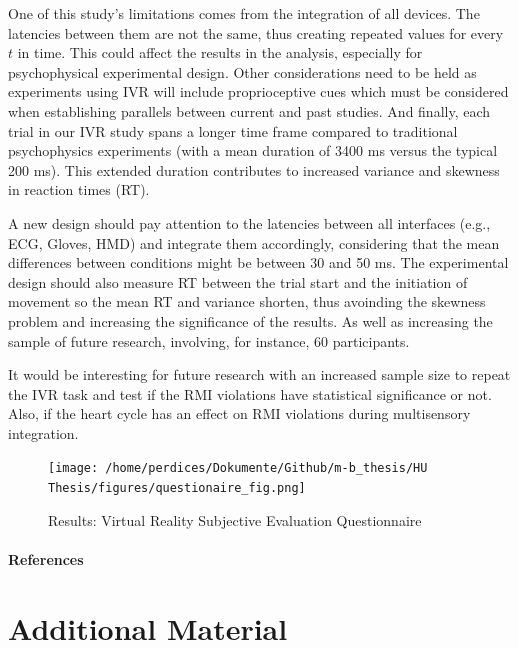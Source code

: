 \documentclass[12pt,oneside,openright]{report}
\begin{document}
One of this study's limitations comes from the integration of all devices. The latencies between them are not the same, thus creating repeated values for every $t$ in time. This could affect the results in the analysis, especially for psychophysical experimental design. Other considerations need to be held as experiments using IVR will include proprioceptive cues which must be considered when establishing parallels between current and past studies. And finally, each trial in our IVR study spans a longer time frame compared to traditional psychophysics experiments (with a mean duration of 3400 ms versus the typical 200 ms). This extended duration contributes to increased variance and skewness in reaction times (RT).

A new design should pay attention to the latencies between all interfaces (e.g., ECG, Gloves, HMD) and integrate them accordingly, considering that the mean differences between conditions might be between 30 and 50 ms. The experimental design should also measure RT between the trial start and the initiation of movement so the mean RT and variance shorten, thus avoinding the skewness problem and increasing the significance of the results. As well as increasing the sample of future research, involving, for instance, 60 participants.

It would be interesting for future research with an increased sample size to repeat the IVR task and test if the RMI violations have statistical significance  or not. Also, if the heart cycle has an effect on RMI violations during multisensory integration.


\newpage
\begin{figure}[ht]
        \centering
        \texttt{[image: /home/perdices/Dokumente/Github/m-b\_thesis/HU Thesis/figures/questionaire\_fig.png]}
        \caption{Results: Virtual Reality Subjective Evaluation Questionnaire}
        \label{fig:quest}
\end{figure}
\pagebreak



\paragraph{\textbf{References}}
\printbibliography[heading=none]


\pagebreak
\vspace*{\fill}
\section*{\centering Additional Material}
\vspace*{\fill}
\end{document}
